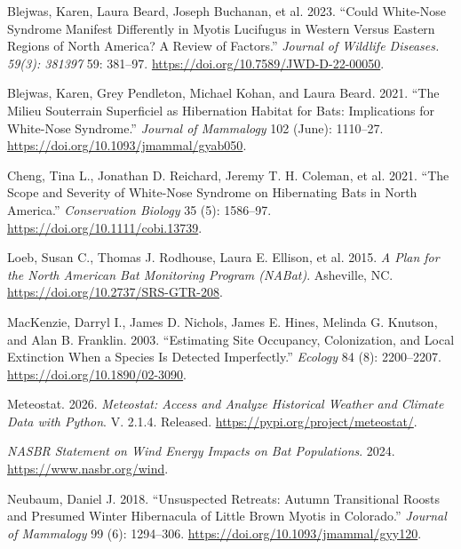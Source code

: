 \documentclass[
  letterpaper,
  DIV=11,
  numbers=noendperiod]{scrartcl}
\newlength{\cslhangindent}
\newenvironment{CSLReferences}[2] %
 {\begin{list}{}{%
  \setlength{\itemindent}{0pt}
  \setlength{\leftmargin}{0pt}
  \setlength{\parsep}{0pt}
  \ifodd #1
   \setlength{\leftmargin}{\cslhangindent}
   \setlength{\itemindent}{-1\cslhangindent}
  \fi
  \setlength{\itemsep}{#2\baselineskip}}}
 {\end{list}}
\begin{document}
\protect{}\label{refs}
\begin{CSLReferences}{1}{1}
Blejwas, Karen, Laura Beard, Joseph Buchanan, et al. 2023. {``Could
White-Nose Syndrome Manifest Differently in Myotis Lucifugus in Western
Versus Eastern Regions of North America? A Review of Factors.''}
\emph{Journal of Wildlife Diseases. 59(3): 381{\textendash}397} 59:
381--97. \url{https://doi.org/10.7589/JWD-D-22-00050}.

Blejwas, Karen, Grey Pendleton, Michael Kohan, and Laura Beard. 2021.
{``The Milieu Souterrain Superficiel as Hibernation Habitat for Bats:
Implications for White-Nose Syndrome.''} \emph{Journal of Mammalogy} 102
(June): 1110--27. \url{https://doi.org/10.1093/jmammal/gyab050}.

Cheng, Tina L., Jonathan D. Reichard, Jeremy T. H. Coleman, et al. 2021.
{``The Scope and Severity of White-Nose Syndrome on Hibernating Bats in
North America.''} \emph{Conservation Biology} 35 (5): 1586--97.
\url{https://doi.org/10.1111/cobi.13739}.

Loeb, Susan C., Thomas J. Rodhouse, Laura E. Ellison, et al. 2015.
\emph{A Plan for the North American Bat Monitoring Program (NABat)}.
Asheville, NC. \url{https://doi.org/10.2737/SRS-GTR-208}.

MacKenzie, Darryl I., James D. Nichols, James E. Hines, Melinda G.
Knutson, and Alan B. Franklin. 2003. {``Estimating Site Occupancy,
Colonization, and Local Extinction When a Species Is Detected
Imperfectly.''} \emph{Ecology} 84 (8): 2200--2207.
\url{https://doi.org/10.1890/02-3090}.

Meteostat. 2026. \emph{Meteostat: Access and Analyze Historical Weather
and Climate Data with Python}. V. 2.1.4. Released.
\url{https://pypi.org/project/meteostat/}.

\emph{NASBR Statement on Wind Energy Impacts on Bat Populations}. 2024.
\url{https://www.nasbr.org/wind}.

Neubaum, Daniel J. 2018. {``Unsuspected Retreats: Autumn Transitional
Roosts and Presumed Winter Hibernacula of Little Brown Myotis in
Colorado.''} \emph{Journal of Mammalogy} 99 (6): 1294--306.
\url{https://doi.org/10.1093/jmammal/gyy120}.


\end{CSLReferences}
\end{document}
